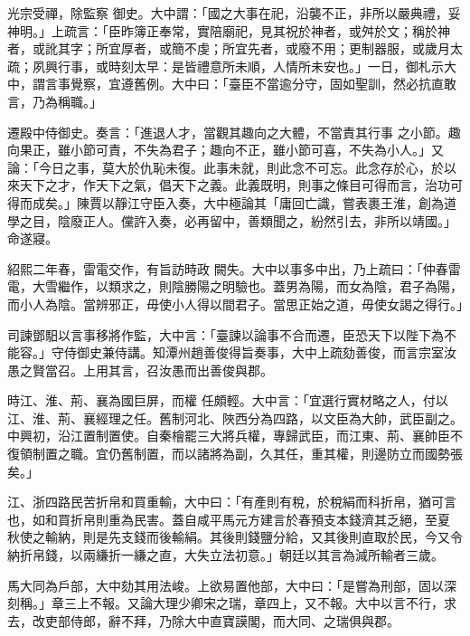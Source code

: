 \begin{pinyinscope}
 光宗受禪，除監察
 御史。大中謂：「國之大事在祀，沿襲不正，非所以嚴典禮，妥神明。」上疏言：「臣昨簿正奉常，實陪廟祀，見其祝於神者，或舛於文；稱於神者，或訛其字；所宜厚者，或簡不虔；所宜先者，或廢不用；更制器服，或歲月太疏；夙興行事，或時刻太早：是皆禮意所未順，人情所未安也。」一日，御札示大中，謂言事覺察，宜遵舊例。大中曰：「臺臣不當逾分守，固如聖訓，然必抗直敢言，乃為稱職。」



 遷殿中侍御史。奏言：「進退人才，當觀其趣向之大體，不當責其行事
 之小節。趣向果正，雖小節可責，不失為君子；趣向不正，雖小節可喜，不失為小人。」又論：「今日之事，莫大於仇恥未復。此事未就，則此念不可忘。此念存於心，於以來天下之才，作天下之氣，倡天下之義。此義既明，則事之條目可得而言，治功可得而成矣。」陳賈以靜江守臣入奏，大中極論其「庸回亡識，嘗表裹王淮，創為道學之目，陰廢正人。儻許入奏，必再留中，善類聞之，紛然引去，非所以靖國。」命遂寢。



 紹熙二年春，雷電交作，有旨訪時政
 闕失。大中以事多中出，乃上疏曰：「仲春雷電，大雪繼作，以類求之，則陰勝陽之明驗也。蓋男為陽，而女為陰，君子為陽，而小人為陰。當辨邪正，毋使小人得以間君子。當思正始之道，毋使女謁之得行。」



 司諫鄧馹以言事移將作監，大中言：「臺諫以論事不合而遷，臣恐天下以陛下為不能容。」守侍御史兼侍講。知潭州趙善俊得旨奏事，大中上疏劾善俊，而言宗室汝愚之賢當召。上用其言，召汝愚而出善俊與郡。



 時江、淮、荊、襄為國巨屏，而權
 任頗輕。大中言：「宜選行實材略之人，付以江、淮、荊、襄經理之任。舊制河北、陜西分為四路，以文臣為大帥，武臣副之。中興初，沿江置制置使。自秦檜罷三大將兵權，專歸武臣，而江東、荊、襄帥臣不復領制置之職。宜仍舊制置，而以諸將為副，久其任，重其權，則邊防立而國勢張矣。」



 江、浙四路民苦折帛和買重輸，大中曰：「有產則有稅，於稅絹而科折帛，猶可言也，如和買折帛則重為民害。蓋自咸平馬元方建言於春預支本錢濟其乏絕，至夏
 秋使之輸納，則是先支錢而後輸絹。其後則錢鹽分給，又其後則直取於民，今又令納折帛錢，以兩縑折一縑之直，大失立法初意。」朝廷以其言為減所輸者三歲。



 馬大同為戶部，大中劾其用法峻。上欲易置他部，大中曰：「是嘗為刑部，固以深刻稱。」章三上不報。又論大理少卿宋之瑞，章四上，又不報。大中以言不行，求去，改吏部侍郎，辭不拜，乃除大中直寶謨閣，而大同、之瑞俱與郡。




\end{pinyinscope}

